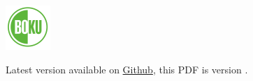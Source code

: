 

\begin{frame}[plain]
    \maketitle
    \begin{center}
        \includegraphics[height=1.7cm]{../common/boku-logo.pdf}\\
    \end{center}
    \vfill
    {
        \tiny
        Latest version available on
        \href{https://github.com/inwe-boku/lecture-scientific-computing/}{Github},
        this PDF is version \gitrevision.
    }
\end{frame}
